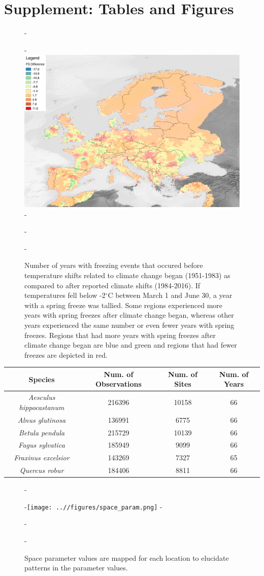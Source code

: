 \documentclass{article}\usepackage[]{graphicx}\usepackage[]{color}
\begin{document}
\section*{Supplement: Tables and Figures}
{\begin{figure} [H]
  -\begin{center}
  -\includegraphics[width=12cm]{..//figures/FS_Diff.pdf}
  -\caption{Number of years with freezing events that occured before temperature shifts related to climate change began (1951-1983) as compared to after reported climate shifts (1984-2016). If temperatures fell below -2$^{\circ}$C between March 1 and June 30, a year with a spring freeze was tallied. Some regions experienced more years with spring freezes after climate change began, whereas other years experienced the same number or even fewer years with spring freezes. Regions that had more years with spring freezes after climate change began are blue and green and regions that had fewer freezes are depicted in red.}\label{fig:region}
  -\end{center}
  -\end{figure}}
  
\begin{center}
 \label{tab:spp} 
\begin{tabular}{c c c c}
\hline
\textbf{Species} & \textbf{Num. of Observations} & \textbf{Num. of Sites} & \textbf{Num. of Years} \\
\hline
\textit{Aesculus hippocastanum} & 216396 & 10158 & 66  \\
\hline
\textit{Alnus glutinosa} & 136991 & 6775 & 66 \\
\hline
\textit{Betula pendula} & 215729 & 10139 & 66 \\
\hline
\textit{Fagus sylvatica} & 185949 & 9099 & 66 \\
\hline
\textit{Fraxinus excelsior} & 143269 & 7327 & 65 \\
\hline
\textit{Quercus robur} & 184406  & 8811 & 66 \\
\end{tabular}
\end{center}
  
{\begin{figure} [H]
  -\begin{center}
  -\texttt{[image: ..//figures/space\_param.png]}
  -\caption{Space parameter values are mapped for each location to elucidate patterns in the parameter values.}\label{fig:space}
  -\end{center}
  -\end{figure}}
  
\end{document}
